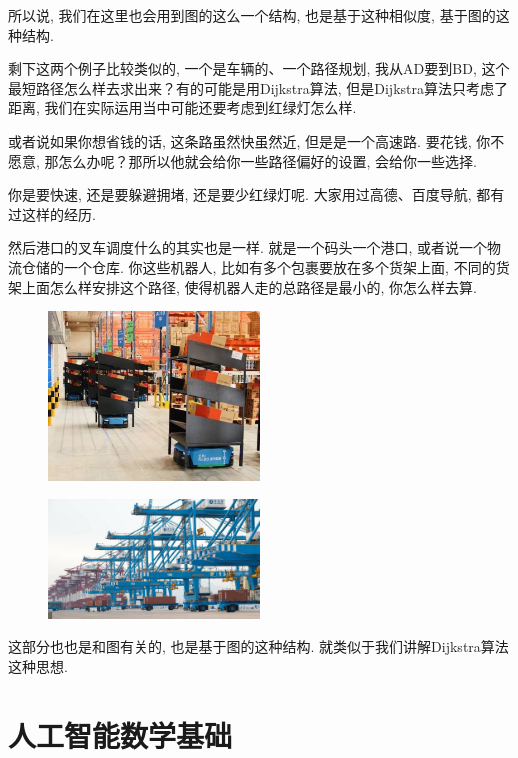 所以说, 我们在这里也会用到图的这么一个结构, 也是基于这种相似度, 基于图的这种结构. 

剩下这两个例子比较类似的, 一个是车辆的、一个路径规划, 我从AD要到BD, 这个最短路径怎么样去求出来？有的可能是用Dijkstra算法, 但是Dijkstra算法只考虑了距离, 我们在实际运用当中可能还要考虑到红绿灯怎么样. 

或者说如果你想省钱的话, 这条路虽然快虽然近, 但是是一个高速路. 要花钱, 你不愿意, 那怎么办呢？那所以他就会给你一些路径偏好的设置, 会给你一些选择. 

你是要快速, 还是要躲避拥堵, 还是要少红绿灯呢. 大家用过高德、百度导航, 都有过这样的经历. 

然后港口的叉车调度什么的其实也是一样. 就是一个码头一个港口, 或者说一个物流仓储的一个仓库. 你这些机器人, 比如有多个包裹要放在多个货架上面, 不同的货架上面怎么样安排这个路径, 使得机器人走的总路径是最小的, 你怎么样去算. 

\begin{figure}[ht]
  \centering
  \includegraphics[width=0.5\textwidth]{asset/aca75bfd-73da-4714-98d3-2f60e8401afd.jpg}
\end{figure}

\begin{figure}[ht]
  \centering
  \includegraphics[width=0.5\textwidth]{asset/3327fbab-a005-4963-a7e9-b413f9ac1c84.jpg}
\end{figure}

这部分也也是和图有关的, 也是基于图的这种结构. 就类似于我们讲解Dijkstra算法这种思想. 

\section{人工智能数学基础}

